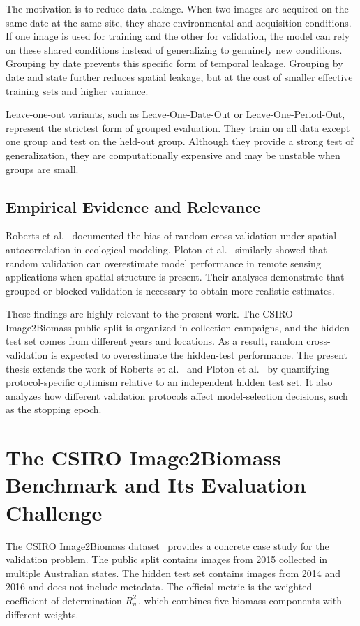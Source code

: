 The motivation is to reduce data leakage. When two images are acquired on the same date at the same site, they share environmental and acquisition conditions. If one image is used for training and the other for validation, the model can rely on these shared conditions instead of generalizing to genuinely new conditions. Grouping by date prevents this specific form of temporal leakage. Grouping by date and state further reduces spatial leakage, but at the cost of smaller effective training sets and higher variance.

Leave-one-out variants, such as Leave-One-Date-Out or Leave-One-Period-Out, represent the strictest form of grouped evaluation. They train on all data except one group and test on the held-out group. Although they provide a strong test of generalization, they are computationally expensive and may be unstable when groups are small.

\subsection{Empirical Evidence and Relevance}

Roberts et al.~\cite{roberts2017cross} documented the bias of random cross-validation under spatial autocorrelation in ecological modeling. Ploton et al.~\cite{ploton2020spatial} similarly showed that random validation can overestimate model performance in remote sensing applications when spatial structure is present. Their analyses demonstrate that grouped or blocked validation is necessary to obtain more realistic estimates.

These findings are highly relevant to the present work. The CSIRO Image2Biomass public split is organized in collection campaigns, and the hidden test set comes from different years and locations. As a result, random cross-validation is expected to overestimate the hidden-test performance. The present thesis extends the work of Roberts et al.~\cite{roberts2017cross} and Ploton et al.~\cite{ploton2020spatial} by quantifying protocol-specific optimism relative to an independent hidden test set. It also analyzes how different validation protocols affect model-selection decisions, such as the stopping epoch.

\section{The CSIRO Image2Biomass Benchmark and Its Evaluation Challenge}

The CSIRO Image2Biomass dataset~\cite{liao2025estimating} provides a concrete case study for the validation problem. The public split contains images from 2015 collected in multiple Australian states. The hidden test set contains images from 2014 and 2016 and does not include metadata. The official metric is the weighted coefficient of determination $R^2_w$, which combines five biomass components with different weights.


